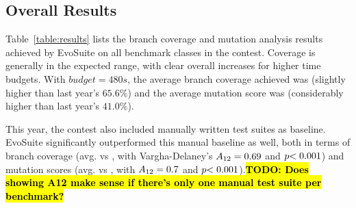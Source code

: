\documentclass[10pt,conference]{IEEEtran}
\newcommand{\EVOSUITE}{{\sc EvoSuite}\xspace}
\newcommand{\TODO}[1]{\sethlcolor{yellow}\textbf{\textcolor{ScarletRed}{\hl{TODO: #1}}}\xspace}
\begin{document}
\begin{table*}[t]
  \centering
  \caption{\label{table:results}Detailed results of \EVOSUITE on the SBST benchmark classes.}
\resizebox{\textwidth}{!}{  

}	
\end{table*}

% 

% 

\subsection{Overall Results}

Table~\ref{table:results} lists the branch coverage and mutation
analysis results achieved by \EVOSUITE on all benchmark classes in the
contest. Coverage is generally in the expected range, with clear
overall increases for higher time budgets. With $budget=480s$, the
average branch coverage achieved was \AvgCovG (slightly higher than
last year's $65.6\%$) and the average mutation score was \AvgMutG
(considerably higher than last year's $41.0\%$).

This year, the contest also included manually written test suites as
baseline. \EVOSUITE significantly outperformed this manual baseline as
well, both in terms of branch coverage (avg. \AvgCovEvosuite vs
\AvgCovManual, with Vargha-Delaney's $A_{12}={0.69}$ and
$p{<0.001}$) and mutation scores (avg. \AvgMutEvosuite vs
\AvgMutManual, with $A_{12}={0.7}$ and
$p{<0.001}$).\TODO{Does showing A12 make sense if there's only one
  manual test suite per benchmark?}


\end{document}
